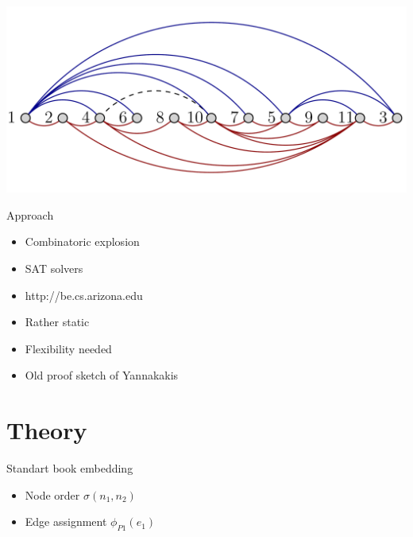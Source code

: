 \documentclass[11pt]{beamer}
\begin{document}
    \begin{frame}
        \includegraphics[width=\linewidth,valign=c]{../_static/graphs/gh_stack.png}
    \end{frame}

    \begin{frame}{Approach}
        \begin{itemize}
            \item Combinatoric explosion
            \item SAT solvers
            \item http://be.cs.arizona.edu
            \item Rather static
            \item Flexibility needed
            \item Old proof sketch of Yannakakis\cite{DBLP:conf/stoc/Yannakakis86}
        \end{itemize}
    \end{frame}

    \section{Theory}\label{sec:theoretical}
    \begin{frame}{Standart book embedding\cite{Bekos2015}}
        \begin{itemize}
            \item Node order $\sigma(n_1,n_2)$
            \item Edge assignment $\phi_{P1}(e_1)$
        \end{itemize}
    \end{frame}
\end{document}
